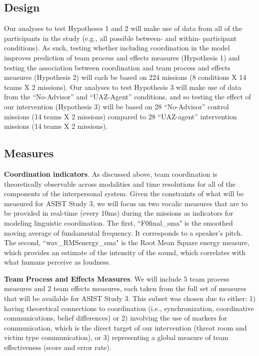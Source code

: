 \subsection{Design}
Our analyses to test Hypotheses 1 and 2 will make use of data from all of the
participants in the study (e.g., all possible between- and within- participant
conditions). As such, testing whether including coordination in the model
improves prediction of team process and effects measures (Hypothesis 1) and
testing the association between coordination and team process and effects
measures (Hypothesis 2) will each be based on 224 missions (8 conditions X 14
teams X 2 missions). Our analyses to test Hypothesis 3 will make use of data
from the ``No-Advisor” and ``UAZ-Agent” conditions, and so testing the effect of
our intervention (Hypothesis 3) will be based on 28 ``No-Advisor” control
missions (14 teams X 2 missions) compared to 28 ``UAZ-agent” intervention
missions (14 teams X 2 missions).

\subsection{Measures}
\textbf{Coordination indicators}. As discussed above, team coordination is
theoretically observable across modalities and time resolutions for all of the
components of the interpersonal system. Given the constraints of what will be
measured for ASIST Study 3, we will focus on two vocalic measures that are to be
provided in real-time (every 10ms) during the missions as indicators for
modeling linguistic coordination. The first, ``F0final\_sma" is the smoothed
moving average of fundamental frequency. It corresponds to a speaker’s pitch.
The second, ``wav\_RMSenergy\_sma" is the Root Mean Square energy measure, which
provides an estimate of the intensity of the sound, which correlates with what
humans perceive as loudness. 

\textbf{Team Process and Effects Measures}. We will include 5 team process
measures and 2 team effects measures, each taken from the full set of measures
that will be available for ASIST Study 3. This subset was chosen due to either:
1) having theoretical connections to coordination (i.e., synchronization,
coordinative communications, belief differences) or 2) involving the use of
markers for communication, which is the direct target of our intervention
(threat room and victim type communication), or 3) representing a global measure
of team effectiveness (score and error rate).


